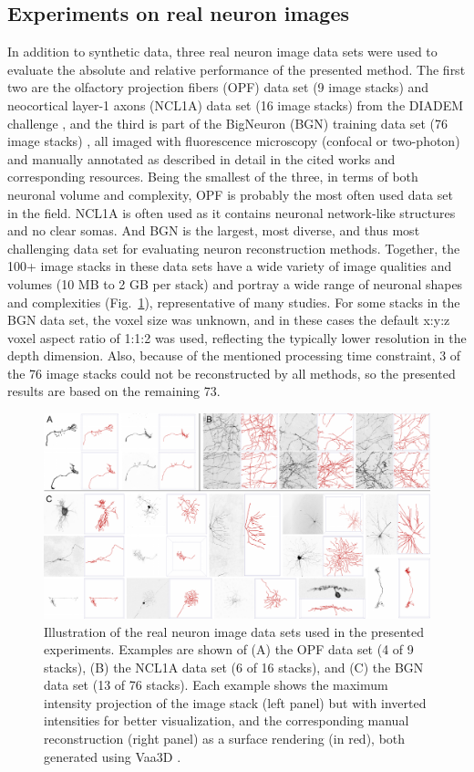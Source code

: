 \subsection{Experiments on real neuron images}
\label{subsec:eval-real}
In addition to synthetic data, three real neuron image data sets were used to evaluate the absolute and relative performance of the presented method. The first two are the olfactory projection fibers (OPF) data set (9 image stacks) and neocortical layer-1 axons (NCL1A) data set (16 image stacks) from the DIADEM challenge \cite{brown2011diadem}, and the third is part of the BigNeuron (BGN) training data set (76 image stacks) \cite{peng2015bigneuron}, all imaged with fluorescence microscopy (confocal or two-photon) and manually annotated as described in detail in the cited works and corresponding resources. Being the smallest of the three, in terms of both neuronal volume and complexity, OPF is probably the most often used data set in the field. NCL1A is often used as it contains neuronal network-like structures and no clear somas. And BGN is the largest, most diverse, and thus most challenging data set for evaluating neuron reconstruction methods. Together, the 100+ image stacks in these data sets have a wide variety of image qualities and volumes (10 MB to 2 GB per stack) and portray a wide range of neuronal shapes and complexities (Fig.~\ref{ch4_fig13}), representative of many studies. For some stacks in the BGN data set, the voxel size was unknown, and in these cases the default x:y:z voxel aspect ratio of 1:1:2 was used, reflecting the typically lower resolution in the depth dimension. Also, because of the mentioned processing time constraint, 3 of the 76 image stacks could not be reconstructed by all methods, so the presented results are based on the remaining 73.
\begin{figure}
	\centering
	\includegraphics[width=\textwidth]{fig13}
	\caption{Illustration of the real neuron image data sets used in the presented experiments. Examples are shown of (A) the OPF data set (4 of 9 stacks), (B) the NCL1A data set (6 of 16 stacks), and (C) the BGN data set (13 of 76 stacks). Each example shows the maximum intensity projection of the image stack (left panel) but with inverted intensities for better visualization, and the corresponding manual reconstruction (right panel) as a surface rendering (in red), both generated using Vaa3D \cite{peng2010v3d}.}
	\label{ch4_fig13}
\end{figure}
